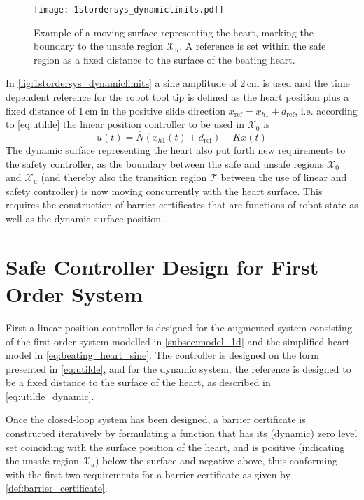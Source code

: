 \begin{figure}[htbp]
	\centering
	\texttt{[image: 1stordersys\_dynamiclimits.pdf]}
	\caption{Example of a moving surface representing the heart, marking the boundary to the unsafe region $\mathcal{X}_u$. A reference is set within the safe region as a fixed distance to the surface of the beating heart.}
	\label{fig:1stordersys_dynamiclimits}
\end{figure}

In \autoref{fig:1stordersys_dynamiclimits} a sine amplitude of 2\,cm is used and the time dependent reference for the robot tool tip is defined as the heart position plus a fixed distance of 1\,cm in the positive slide direction $x_\text{ref}=x_{h1}+d_\text{ref}$, i.e. according to \autoref{eq:utilde} the linear position controller to be used in $\mathcal{X}_0$ is
\begin{equation}
\tilde{u}(t) = \bar{N}(x_{h1}(t)+d_\text{ref})-Kx(t) \label{eq:utilde_dynamic}
\end{equation}
The dynamic surface representing the heart also put forth new requirements to the safety controller, as the boundary between the safe and unsafe regions $\mathcal{X}_0$ and $\mathcal{X}_u$ (and thereby also the transition region $\mathcal{T}$ between the use of linear and safety controller) is now moving concurrently with the heart surface. This requires the construction of barrier certificates that are functions of robot state as well as the dynamic surface position.



\section{Safe Controller Design for First Order System}
First a linear position controller is designed for the augmented system consisting of the first order system modelled in \autoref{subsec:model_1d} and the simplified heart model in \autoref{eq:beating_heart_sine}. The controller is designed on the form presented in \autoref{eq:utilde}, and for the dynamic system, the reference is designed to be a fixed distance to the surface of the heart, as described in \autoref{eq:utilde_dynamic}.

Once the closed-loop system has been designed, a barrier certificate is constructed iteratively by formulating a function that has its (dynamic) zero level set coinciding with the surface position of the heart, and is positive (indicating the unsafe region $\mathcal{X}_u$) below the surface and negative above, thus conforming with the first two requirements for a barrier certificate as given by \autoref{def:barrier_certificate}.

